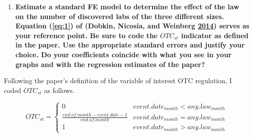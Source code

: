 \documentclass[
  11pt,
]{article}
\providecommand{\tightlist}{%
  \setlength{\itemsep}{0pt}\setlength{\parskip}{0pt}}
\begin{document}
\begin{enumerate}
\def\labelenumi{(\alph{enumi})}
\setcounter{enumi}{2}
\tightlist
\item
  \textbf{Estimate a standard FE model to determine the effect of the
  law on the number of discovered labs of the three different sizes.
  Equation (\ref{eq:1}) of (Dobkin, Nicosia, and Weinberg
  \protect\hyperlink{ref-DOBKIN201448}{2014}) serves as your reference
  point. Be sure to code the \(OTC_{st}\) indicator as defined in the
  paper. Use the appropriate standard errors and justify your choice. Do
  your coefficients coincide with what you see in your graphs and with
  the regression estimates of the paper?}
\end{enumerate}

Following the paper's definition of the variable of interest OTC
regulation, I coded \(OTC_{st}\) as follows.

\[OTC_{st} = \begin{cases} 
      0 & event.date_{month} < any.law_{month} \\
      \frac{end.of.month-event.date-1}{end.of.month} & event.date_{month} = any.law_{month} \\
      1 & event.date_{month} > any.law_{month}
   \end{cases}\]
\end{document}
